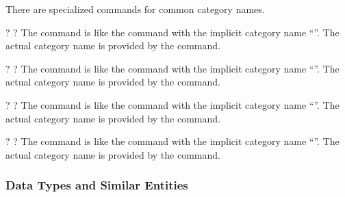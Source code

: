 \documentclass{scrartcl}
\begin{document}
{There are specialized commands for common category names.

\begin{definition}
 \code{*}\kleene? \kleene? 
The  command is like the  command with the
implicit category name “”.  The actual category name is
provided by the  command.
\end{definition}

\begin{definition}
 \code{*}\kleene? \kleene? 
The  command is like the  command with
the implicit category name “”.  The actual category name
is provided by the  command.
\end{definition}

\begin{definition}
 \code{*}\kleene? \kleene? 
The  command is like the  command with
the implicit category name “”.  The actual category name
is provided by the  command.
\end{definition}

\begin{definition}
 \code{*}\kleene? \kleene? 
The  command is like the  command with the
implicit category name “”.  The actual category name is
provided by the  command.
\end{definition}


\subsubsection{Data Types and Similar Entities}

}
\end{document}
